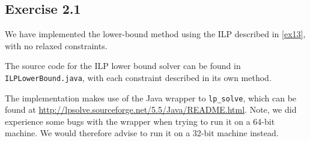 \documentclass[11pt,a4paper]{article}
\begin{document}
\subsection{Exercise 2.1}
We have implemented the lower-bound method using the ILP described in \autoref{ex13},
with no relaxed constraints.

The source code for the ILP lower bound solver can be found in \texttt{ILPLowerBound.java},
with each constraint described in its own method.

The implementation makes use of the Java wrapper to \texttt{lp\_solve}, which
can be found at \url{http://lpsolve.sourceforge.net/5.5/Java/README.html}.
Note, we did experience some bugs with the wrapper when trying to run it on a
64-bit machine. We would therefore advise to run it on a 32-bit machine instead.
\end{document}
